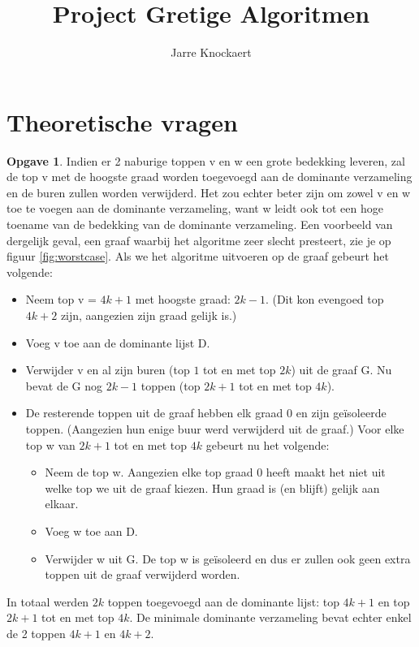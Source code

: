 \documentclass[11pt, a4paper, table]{article}
\theoremstyle{definition}
\newtheorem{opgave}{Opgave}
\begin{document}
	\title{Project Gretige Algoritmen}
	\author{Jarre Knockaert}
	\maketitle
	
\thispagestyle{empty}
\newpage
{}

\section{Theoretische vragen}
\begin{opgave}
	Indien er 2 naburige toppen v en w een grote bedekking leveren, zal de top v met de hoogste graad worden toegevoegd aan de dominante verzameling en de buren zullen worden verwijderd. Het zou echter beter zijn om zowel v en w toe te voegen aan de dominante verzameling, want w leidt ook tot een hoge toename van de bedekking van de dominante verzameling. 
	Een voorbeeld van dergelijk geval, een graaf waarbij het algoritme zeer slecht presteert, zie je op figuur \ref{fig:worstcase}. Als we het algoritme uitvoeren op de graaf gebeurt het volgende:
	\begin{itemize}
		\item Neem top v = $4k+1$ met hoogste graad: $2k-1$. (Dit kon evengoed top $4k+2$ zijn, aangezien zijn graad gelijk is.)
		\item Voeg v toe aan de dominante lijst D. 
		\item Verwijder v en al zijn buren (top $1$ tot en met top $2k$) uit de graaf G. Nu bevat de G nog $2k-1$ toppen (top $2k+1$ tot en met top $4k$).
		\item De resterende toppen uit de graaf hebben elk graad 0 en zijn ge\"{i}soleerde toppen. (Aangezien hun enige buur werd verwijderd uit de graaf.) Voor elke top w van $2k+1$ tot en met top $4k$ gebeurt nu het volgende:
		\begin{itemize}
			\item Neem de top w. Aangezien elke top graad 0 heeft maakt het niet uit welke top we uit de graaf kiezen. Hun graad is (en blijft) gelijk aan elkaar. 
			\item Voeg w toe aan D. 
			\item Verwijder w uit G. De top w is ge\"{i}soleerd en dus er zullen ook geen extra toppen uit de graaf verwijderd worden. 
		\end{itemize}
	\end{itemize}
	In totaal werden $2k$ toppen toegevoegd aan de dominante lijst: top $4k+1$ en top $2k+1$ tot en met top $4k$. De minimale dominante verzameling bevat echter enkel de 2 toppen $4k+1$ en $4k+2$. 

\end{opgave}
\end{document}
